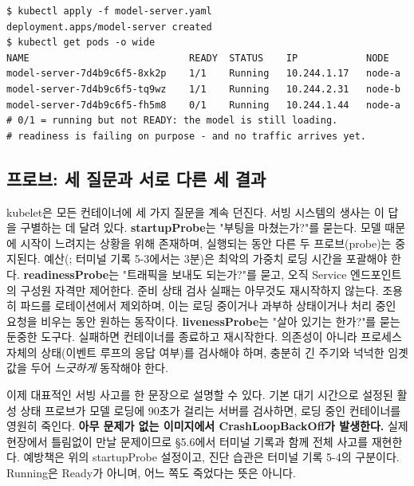 \begin{terminalbox}
\begin{Verbatim}[breaklines=true,breakanywhere=true,fontsize=\small,formatcom=\color{tbbtermfg},codes=\tbbcodeactive]
$ kubectl apply -f model-server.yaml
deployment.apps/model-server created
$ kubectl get pods -o wide
NAME                            READY  STATUS    IP            NODE
model-server-7d4b9c6f5-8xk2p    1/1    Running   10.244.1.17   node-a
model-server-7d4b9c6f5-tq9wz    1/1    Running   10.244.2.31   node-b
model-server-7d4b9c6f5-fh5m8    0/1    Running   10.244.1.44   node-a
# 0/1 = running but not READY: the model is still loading.
# readiness is failing on purpose - and no traffic arrives yet.
\end{Verbatim}
\end{terminalbox}

\subsection*{프로브: 세 질문과 서로 다른 세 결과}

kubelet은 모든 컨테이너에 세 가지 질문을 계속 던진다. 서빙 시스템의 생사는 이 답을 구별하는 데 달려 있다. \textbf{startupProbe}는 "부팅을 마쳤는가?"를 묻는다. 모델 때문에 시작이 느려지는 상황을 위해 존재하며, 실행되는 동안 다른 두 프로브(probe)는 중지된다. 예산(; 터미널 기록 5-3에서는 3분)은 최악의 가중치 로딩 시간을 포괄해야 한다. \textbf{readinessProbe}는 "트래픽을 보내도 되는가?"를 묻고, 오직 Service 엔드포인트의 구성원 자격만 제어한다. 준비 상태 검사 실패는 아무것도 재시작하지 않는다. 조용히 파드를 로테이션에서 제외하며, 이는 로딩 중이거나 과부하 상태이거나 처리 중인 요청을 비우는 동안 원하는 동작이다. \textbf{livenessProbe}는 "살아 있기는 한가?"를 묻는 둔중한 도구다. 실패하면 컨테이너를 종료하고 재시작한다. 의존성이 아니라 프로세스 자체의 상태(이벤트 루프의 응답 여부)를 검사해야 하며, 충분히 긴 주기와 넉넉한 임곗값을 두어 \textit{느긋하게} 동작해야 한다.

이제 대표적인 서빙 사고를 한 문장으로 설명할 수 있다. 기본 대기 시간으로 설정된 활성 상태 프로브가 모델 로딩에 90초가 걸리는 서버를 검사하면, 로딩 중인 컨테이너를 영원히 죽인다. \textbf{아무 문제가 없는 이미지에서 CrashLoopBackOff가 발생한다.} 실제 현장에서 틀림없이 만날 문제이므로 §5.6에서 터미널 기록과 함께 전체 사고를 재현한다. 예방책은 위의 startupProbe 설정이고, 진단 습관은 터미널 기록 5-4의 구분이다. Running은 Ready가 아니며, 어느 쪽도 죽었다는 뜻은 아니다.

